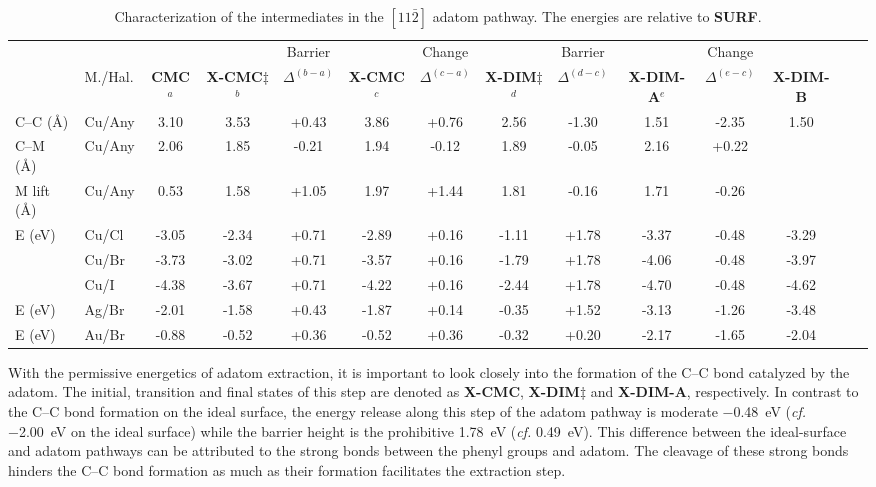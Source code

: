\documentclass[aps,prb,amsmath,amssymb,11pt]{revtex4-1}
\newcommand{\comm}{\color{purple}} %
\begin{document}
\begin{table}
\centering
\caption{Characterization of the intermediates in the $[11\bar{2}]$ adatom pathway. The energies are relative to \textbf{SURF}. 
}
\label{table:adatom-longitude}
\begin{tabular}{ llcccccccccccc  }
 \hline
 \hline
  & & & & Barrier & & Change & & Barrier & &Change&\\
  & M./Hal. & \textbf{CMC}$^{a}$ & \textbf{X-CMC$\ddagger$}$^{b}$ & $\Delta^{(b-a)}$ & \textbf{X-CMC}$^{c}$ &$\Delta^{(c-a)}$ & \textbf{X-DIM$\ddagger$}$^{d}$ & $\Delta^{(d-c)}$ & \textbf{X-DIM-A}$^{e}$ &$\Delta^{(e-c)}$ & \textbf{X-DIM-B}  \\ 
 \hline
 \hline 
 {C--C (\si{\angstrom})} & Cu/Any & {3.10} & {3.53} & {+0.43} & {3.86} &{+0.76} & {2.56} & {-1.30} & {1.51} &{-2.35} &{1.50}\\ 
 \hline
 {C--M (\si{\angstrom}) } & Cu/Any & {2.06} & {1.85} & {-0.21} & {1.94} &{-0.12} & {1.89} & {-0.05} & {2.16} &{+0.22} & \\ 
 \hline
 {M lift (\si{\angstrom}) } & Cu/Any & {0.53} & {1.58} & {+1.05} & {1.97} &{+1.44} & {1.81} & {-0.16} & {1.71} &{-0.26} & \\ 
 \hline
 \multirow{3}{*}{E (\si{\electronvolt}) } & Cu/Cl & -3.05 &-2.34 & +0.71 &-2.89 &+0.16 &-1.11 & +1.78 & -3.37&-0.48&-3.29\\ 
 & Cu/Br &-3.73 &-3.02 &+0.71 & -3.57 &+0.16 &-1.79 & +1.78 & -4.06 & -0.48&-3.97 \\ 
 & Cu/I  & -4.38 & -3.67 & +0.71 & -4.22 &+0.16 &-2.44 & +1.78 & -4.70 & -0.48&-4.62\\ 
 \hline
 E (\si{\electronvolt}) & Ag/Br &-2.01 &-1.58 &+0.43 &-1.87 &+0.14 &-0.35 &+1.52 &-3.13 &-1.26 &-3.48 \\ 
 E (\si{\electronvolt}) & Au/Br &-0.88 &-0.52 &+0.36 &-0.52 &+0.36 &-0.32 &+0.20 &-2.17 &-1.65 &-2.04 \\
  \hline
 \hline
\end{tabular}
\end{table}

With the permissive energetics of adatom extraction, it is important to look closely into the formation of the C--C bond catalyzed by the adatom. 
The initial, transition and final states of this step are denoted as \textbf{X-CMC}, \textbf{X-DIM$\ddagger$} and \textbf{X-DIM-A}, respectively.
In contrast to the C--C bond formation on the ideal surface, the energy release along this step of the adatom pathway is moderate \SI{-0.48}{\electronvolt} (\textit{cf.} \SI{-2.00}{\electronvolt} on the ideal surface) while the barrier height is the prohibitive \SI{1.78}{\electronvolt} (\textit{cf.} \SI{0.49}{\electronvolt}). 
This difference between the ideal-surface and adatom pathways can be attributed to the strong bonds between the phenyl groups and adatom.
The cleavage of these strong bonds hinders the C--C bond formation as much as their formation facilitates the extraction step. %
\end{document}
